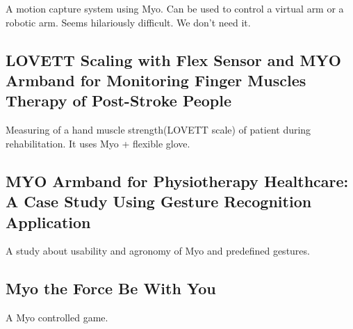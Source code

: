 \documentclass{article}
\begin{document}
A motion capture system using Myo. Can be used to control a virtual arm or a robotic arm. Seems hilariously difficult. We don't need it.

\subsection{LOVETT Scaling with Flex Sensor and MYO Armband for Monitoring Finger Muscles Therapy of Post-Stroke People}

Measuring of a hand muscle strength(LOVETT scale) of patient during rehabilitation. It uses Myo + flexible glove. 

\subsection{MYO Armband for Physiotherapy Healthcare: A Case Study Using Gesture Recognition Application}

A study about usability and agronomy of Myo and predefined gestures.

\subsection{Myo the Force Be With You}

A Myo controlled game.
\end{document}
